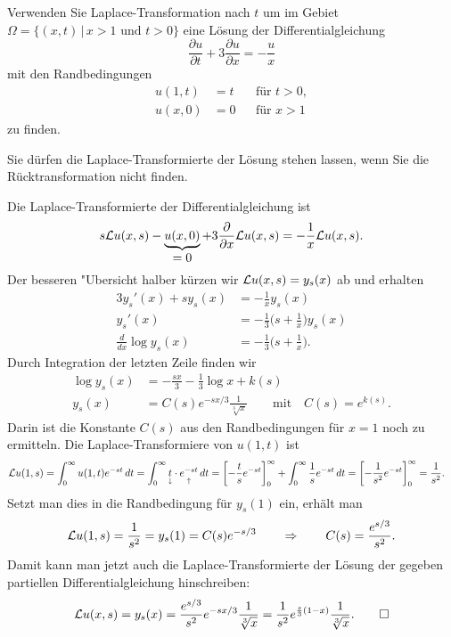 Verwenden Sie Laplace-Transformation nach $t$ um
im Gebiet $\Omega=\{(x,t)\,|\, x > 1 \text{ und } t > 0\}$ eine
Lösung der Differentialgleichung
\begin{equation}
\frac{\partial u}{\partial t} +3\frac{\partial u}{\partial x} = -\frac{u}{x}
\label{50000012:dgl}
\end{equation}
mit den Randbedingungen
\begin{equation}
\begin{aligned}
u(1,t)&=t& &\text{für $t>0$},\\
u(x,0)&=0& &\text{für $x > 1$}
\end{aligned}
\label{50000012:rb}
\end{equation}
zu finden.

\begin{hinweis}
Sie dürfen die Laplace-Transformierte der Lösung stehen lassen, wenn Sie
die Rücktransformation nicht finden.
\end{hinweis}

\begin{loesung}
Die Laplace-Transformierte der Differentialgleichung ist
\[
s{\cal L}u(x,s) - \underbrace{u(x,0)}_{\displaystyle =0}
+ 3\frac{\partial }{\partial x}{\cal L}u(x,s)
=
-\frac1x{\cal L}u(x,s).
\]
Der besseren "Ubersicht halber kürzen wir ${\cal L}u(x,s)=y_s(x)$ ab
und erhalten
\begin{align*}
3y_s'(x) + sy_s(x) &= -\frac1x y_s(x)
\\
y_s'(x)&=-\frac13\biggl(s+\frac1x\biggr) y_s(x)
\\
\frac{d}{dx} \log y_s(x) &= -\frac13\biggl(s+\frac1x\biggr).
\end{align*}
Durch Integration der letzten Zeile finden wir
\begin{align*}
\log y_s(x) &= -\frac{sx}{3}-\frac13\log x + k(s)
\\
y_s(x) &= C(s) e^{-sx/3}\frac1{\sqrt[3]{x}}\qquad\text{mit}\quad C(s)=e^{k(s)}.
\end{align*}
Darin ist die Konstante $C(s)$ aus den Randbedingungen für $x=1$
noch zu ermitteln.
Die Laplace-Transformiere von $u(1,t)$ ist
\begin{align*}
{\cal L}u(1,s)
&=
\int_0^\infty u(1,t)e^{-st}\,dt
=
\int_0^\infty \underset{\downarrow}{t}\cdot\underset{\uparrow}{e^{-st}}\,dt
=
\biggl[-\frac{t}se^{-st}\biggr]_0^\infty
+\int_0^\infty \frac1s e^{-st}\,dt
=
\biggl[ -\frac1{s^2}e^{-st}\biggr]_0^\infty=\frac1{s^2}.
\end{align*}
Setzt man dies in die Randbedingung für $y_s(1)$ ein, erhält man
\[
{\cal L}u(1,s) = \frac1{s^2} = y_s(1)=C(s) e^{-s/3}
\qquad
\Rightarrow
\qquad
C(s) = \frac{e^{s/3}}{s^2}.
\]
Damit kann man jetzt auch die Laplace-Transformierte der Lösung der gegeben
partiellen Differentialgleichung hinschreiben:
\[
{\cal L}u(x,s)
=
y_s(x)
=
\frac{e^{s/3}}{s^2}e^{-sx/3}\frac1{\sqrt[3]{x}}
=
\frac1{s^2}e^{\frac{s}3(1-x)}\frac1{\sqrt[3]{x}}.
\qedhere
\]
\end{loesung}

